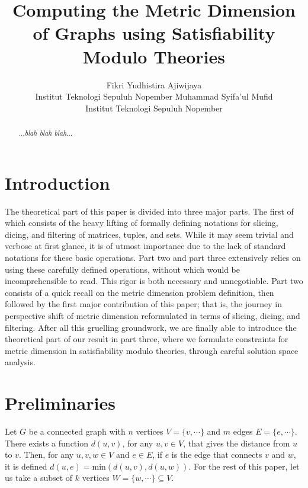 \documentclass{article}
\title{Computing the Metric Dimension of Graphs using Satisfiability Modulo Theories}
\author{
	Fikri Yudhistira Ajiwijaya \\
	Institut Teknologi Sepuluh Nopember
	\And
	Muhammad Syifa'ul Mufid \\
	Institut Teknologi Sepuluh Nopember
}
\begin{document}
\maketitle

\begin{abstract}
	...\textit{blah blah blah}...
\end{abstract}

\section{Introduction}

The theoretical part of this paper is divided into three major parts. The first of which consists of the heavy lifting of formally defining notations for slicing, dicing, and filtering of matrices, tuples, and sets. While it may seem trivial and verbose at first glance, it is of utmost importance due to the lack of standard notations for these basic operations. Part two and part three extensively relies on using these carefully defined operations, without which would be incomprehensible to read. This rigor is both necessary and unnegotiable. Part two consists of a quick recall on the metric dimension problem definition, then followed by the first major contribution of this paper; that is, the journey in perspective shift of metric dimension reformulated in terms of slicing, dicing, and filtering. After all this gruelling groundwork, we are finally able to introduce the theoretical part of our result in part three, where we formulate constraints for metric dimension in satisfiability modulo theories, through careful solution space analysis.

\section{Preliminaries}

Let \(G\) be a connected graph with \(n\) vertices \(V = \{v, \cdots\}\) and \(m\) edges \(E = \{e, \cdots\}\). There exists a function \(d(u, v)\), for any \(u, v \in V\), that gives the distance from \(u\) to \(v\). Then, for any \(u, v, w \in V\) and \(e \in E\), if \(e\) is the edge that connects \(v\) and \(w\), it is defined \(d(u, e) = \mathrm{min}(d(u, v), d(u, w))\). For the rest of this paper, let us take a subset of \(k\) vertices \(W = \{w, \cdots\} \subseteq V\).
\end{document}
